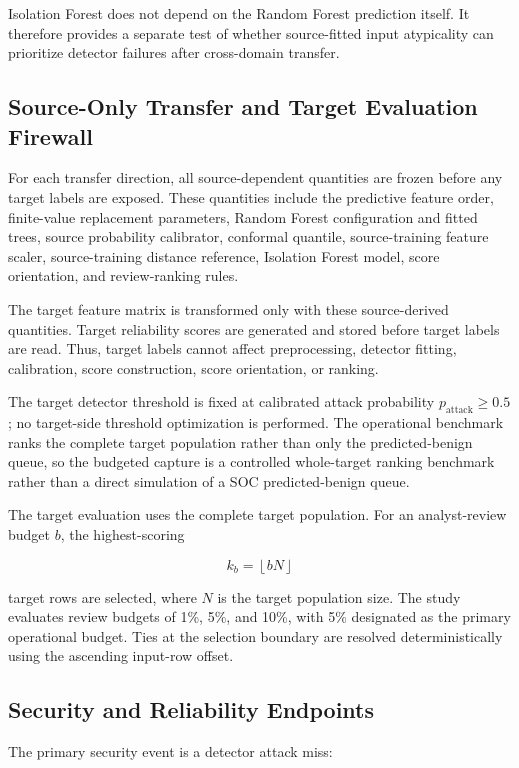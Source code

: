 \documentclass[conference]{IEEEtran}
\begin{document}
Isolation Forest does not depend on the Random Forest prediction itself. It therefore provides a separate test of whether source-fitted input atypicality can prioritize detector failures after cross-domain transfer.

\subsection{Source-Only Transfer and Target Evaluation Firewall}

For each transfer direction, all source-dependent quantities are frozen before any target labels are exposed. These quantities include the predictive feature order, finite-value replacement parameters, Random Forest configuration and fitted trees, source probability calibrator, conformal quantile, source-training feature scaler, source-training distance reference, Isolation Forest model, score orientation, and review-ranking rules.

The target feature matrix is transformed only with these source-derived quantities. Target reliability scores are generated and stored before target labels are read. Thus, target labels cannot affect preprocessing, detector fitting, calibration, score construction, score orientation, or ranking.

The target detector threshold is fixed at calibrated attack probability \(p_{\mathrm{attack}}\ge 0.5\); no target-side threshold optimization is performed. The operational benchmark ranks the complete target population rather than only the predicted-benign queue, so the budgeted capture is a controlled whole-target ranking benchmark rather than a direct simulation of a SOC predicted-benign queue.

The target evaluation uses the complete target population. For an analyst-review budget \(b\), the highest-scoring

\[
k_b=\left\lfloor bN\right\rfloor
\]

target rows are selected, where \(N\) is the target population size. The study evaluates review budgets of 1\%, 5\%, and 10\%, with 5\% designated as the primary operational budget. Ties at the selection boundary are resolved deterministically using the ascending input-row offset.

\subsection{Security and Reliability Endpoints}

The primary security event is a detector attack miss:
\end{document}
